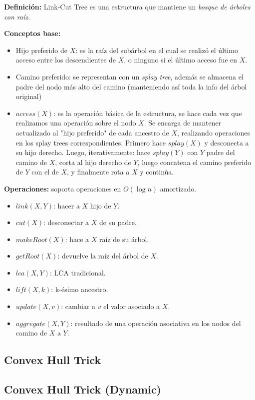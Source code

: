 \textbf{Definición:} Link-Cut Tree es una estructura que mantiene un \emph{bosque de árboles con raíz}.

\textbf{Conceptos base:}
\begin{itemize}
    \item Hijo preferido de $X$: es la raíz del subárbol en el cual se realizó el último acceso 
    entre los descendientes de $X$, o ninguno si el último acceso fue en $X$.
    \item Camino preferido: se representan con un \emph{splay tree}, además se almacena el padre 
    del nodo más alto del camino (manteniendo así toda la info del árbol original)
    \item $access(X)$: es la operación básica de la estructura, se hace cada vez que realizamos una
    operación sobre el nodo $X$. Se encarga de mantener actualizado al "hijo preferido" de cada ancestro
    de $X$, realizando operaciones en los splay trees correspondientes. Primero hace $splay(X)$ y desconecta
    a su hijo derecho. Luego, iterativamente: hace $splay(Y)$ con $Y$ padre del camino de $X$, corta 
    al hijo derecho de $Y$, luego concatena el camino preferido de $Y$ con el de $X$, y finalmente rota 
    a $X$ y continúa.
\end{itemize}

\textbf{Operaciones:} soporta operaciones en $O(\log{}n)$ amortizado.
\begin{itemize}
    \item $link(X, Y)$: hacer a $X$ hijo de $Y$.
    \item $cut(X)$: desconectar a $X$ de su padre.
    \item $makeRoot(X)$: hace a $X$ raíz de su árbol.
    \item $getRoot(X)$: devuelve la raíz del árbol de $X$.
    \item $lca(X,Y)$: LCA tradicional.
    \item $lift(X,k)$: k-ésimo ancestro.
    \item $update(X,v)$: cambiar a $v$ el valor asociado a $X$.
    \item $aggregate(X,Y)$: resultado de una operación asociativa en los nodos del camino de $X$ a $Y$.
\end{itemize}

\subsection{Convex Hull Trick}
\subsection{Convex Hull Trick (Dynamic)}
